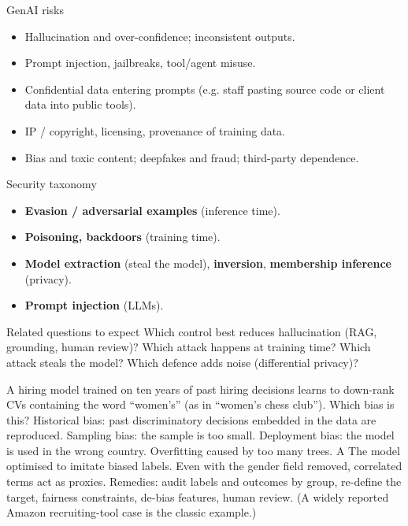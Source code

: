 {\begin{block}{GenAI risks}
		\begin{itemize}
			\item Hallucination and over-confidence; inconsistent outputs.
			\item Prompt injection, jailbreaks, tool/agent misuse.
			\item Confidential data entering prompts (e.g. staff pasting source code or client data into public tools).
			\item IP / copyright, licensing, provenance of training data.
			\item Bias and toxic content; deepfakes and fraud; third-party dependence.
\end{itemize}\end{block}}
{\begin{block}{Security taxonomy}
		\begin{itemize}
			\item \textbf{Evasion / adversarial examples} (inference time).
			\item \textbf{Poisoning, backdoors} (training time).
			\item \textbf{Model extraction} (steal the model), \textbf{inversion}, \textbf{membership inference} (privacy).
			\item \textbf{Prompt injection} (LLMs).
	\end{itemize}\end{block}
	\begin{alertblock}{Related questions to expect}
		Which control best reduces hallucination (RAG, grounding, human review)? Which attack happens at training time? Which attack steals the model? Which defence adds noise (differential privacy)?
\end{alertblock}}

{A hiring model trained on ten years of past hiring decisions learns to down-rank CVs containing the word ``women's'' (as in ``women's chess club''). Which bias is this?}
{Historical bias: past discriminatory decisions embedded in the data are reproduced.}
{Sampling bias: the sample is too small.}
{Deployment bias: the model is used in the wrong country.}
{Overfitting caused by too many trees.}
{A}
{The model optimised to imitate biased labels. Even with the gender field removed, correlated terms act as proxies. Remedies: audit labels and outcomes by group, re-define the target, fairness constraints, de-bias features, human review. (A widely reported Amazon recruiting-tool case is the classic example.)}

